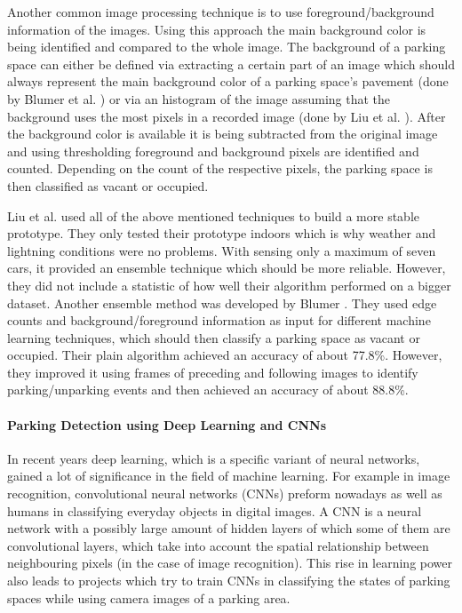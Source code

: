 Another common image processing technique is to use foreground/background information of the images. Using this approach the main background color is being identified and compared to the whole image. The background of a parking space can either be defined via extracting a certain part of an image which should always represent the main background color of a parking space's pavement (done by Blumer et al. \cite{Blumer2012}) or via an histogram of the image assuming that the background uses the most pixels in a recorded image (done by Liu et al. \cite{stationary_camera_sensing}). After the background color is available it is being subtracted from the original image and using thresholding foreground and background pixels are identified and counted. Depending on the count of the respective pixels, the parking space is then classified as vacant or occupied.

Liu et al. \cite{stationary_camera_sensing} used all of the above mentioned techniques to build a more stable prototype. They only tested their prototype indoors which is why weather and lightning conditions were no problems. With sensing only a maximum of seven cars, it provided an ensemble technique which should be more reliable. However, they did not include a statistic of how well their algorithm performed on a bigger dataset. Another ensemble method was developed by Blumer \cite{Blumer2012}. They used edge counts and background/foreground information as input for different machine learning techniques, which should then classify a parking space as vacant or occupied. Their plain algorithm achieved an accuracy of about 77.8\%. However, they improved it using frames of preceding and following images to identify parking/unparking events and then achieved an accuracy of about 88.8\%.


\paragraph{Parking Detection using Deep Learning and CNNs}

In recent years deep learning, which is a specific variant of neural networks, gained a lot of significance in the field of machine learning. For example in image recognition, convolutional neural networks (CNNs) preform nowadays as well as humans in classifying everyday objects in digital images. A CNN is a neural network with a possibly large amount of hidden layers of which some of them are convolutional layers, which take into account the spatial relationship between neighbouring pixels (in the case of image recognition). This rise in learning power also leads to projects which try to train CNNs in classifying the states of parking spaces while using camera images of a parking area.

